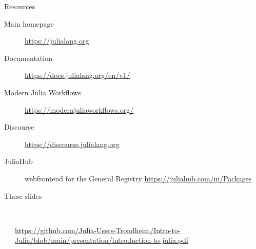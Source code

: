 \documentclass[aspectratio=169, 12pt]{beamer}
\begin{document}
    \begin{frame}{Resources}
        \begin{description}
            \item[Main homepage] \url{https://julialang.org}
            \item[Documentation] \url{https://docs.julialang.org/en/v1/}
            \item[Modern Julia Workflows] \url{https://modernjuliaworkflows.org/}
            \item[Discourse] \url{https://discourse.julialang.org}
            \item[JuliaHub] webfrontend for the General Registry
            \url{https://juliahub.com/ui/Packages}
            \item[These slides]
        \end{description}
        \vspace{-1.25\baselineskip}
        \begin{columns}[T]
            \begin{column}{.075\textwidth}
            \end{column}
            \begin{column}{.64\textwidth}
                \ \\[.5\baselineskip]
                \url{https://github.com/Julia-Users-Trondheim/Intro-to-Julia/blob/main/presentation/introduction-to-julia.pdf}
            \end{column}
            \begin{column}{.33\textwidth}
            \end{column}
            \begin{column}{.005\textwidth}
            \end{column}
        \end{columns}
        \vspace{.75\baselineskip}
    \end{frame}
\end{document}
